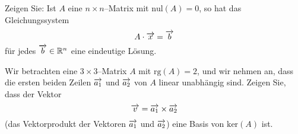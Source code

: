 \begin{aufgabe} Zeigen Sie: Ist $A$ eine $n \times n$--Matrix mit $\textrm{nul}(A) = 0$, so hat das 
Gleichungssystem 
  	$$  A  \cdot \overrightarrow{x} = \overrightarrow{b} $$
für jedes $\overrightarrow{b} \in \mathbb R^n$ eine eindeutige Lösung.
\end{aufgabe}

\begin{aufgabe} Wir betrachten eine $3 \times 3$--Matrix $A$ mit $\textrm{rg}(A) = 2$, und wir nehmen 
an, dass die ersten beiden Zeilen $\overrightarrow{a_1}$ und $\overrightarrow{a_2}$ von $A$ 
linear unabhängig sind. Zeigen Sie, dass der Vektor
  	$$ \overrightarrow{v} = \overrightarrow{a_1} \times \overrightarrow{a_2} $$
(das Vektorprodukt der Vektoren  $\overrightarrow{a_1}$ und $\overrightarrow{a_2}$) eine Basis von  
$\textrm{ker}(A)$ ist.
\end{aufgabe}
